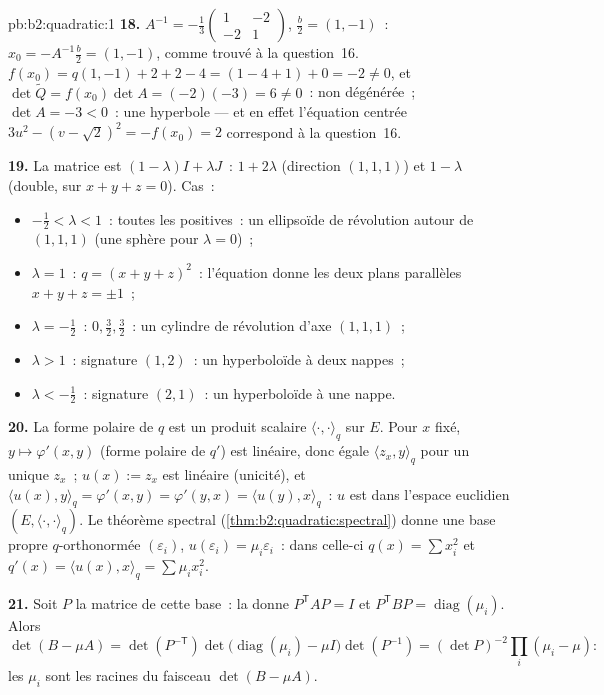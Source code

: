 \begin{solution}{pb:b2:quadratic:1}
\textbf{18.} $A^{-1} = -\frac13\begin{pmatrix} 1 & -2\\ -2 &
1\end{pmatrix}$, $\frac b2 = (1, -1)$~: $x_0 =
-A^{-1}\frac b2 = (1, -1)$, comme trouvé à la question~16. $f(x_0) =
q(1,-1) + 2 + 2 - 4 = (1 - 4 + 1) + 0 = -2 \neq 0$, et
$\det\widetilde Q = f(x_0)\det A = (-2)(-3) = 6 \neq 0$~:
non dégénérée~; $\det A = -3 < 0$~: une hyperbole --- et en effet
l'équation centrée $3u^2 - (v - \sqrt2)^2 = -f(x_0) = 2$
correspond à la question~16.

\textbf{19.} La matrice est $(1-\lambda)I + \lambda J$~:
 $1 + 2\lambda$ (direction $(1,1,1)$) et $1 -
\lambda$ (double, sur $x + y + z = 0$). Cas~:
\begin{itemize}
  \item $-\frac12 < \lambda < 1$~: toutes les 
        positives~: un ellipsoïde de révolution autour de
        $(1,1,1)$ (une sphère pour $\lambda = 0$)~;
  \item $\lambda = 1$~: $q = (x+y+z)^2$~: l'équation donne les
        deux plans parallèles $x + y + z = \pm1$~;
  \item $\lambda = -\frac12$~:  $0, \frac32,
        \frac32$~: un cylindre de révolution d'axe $(1,1,1)$~;
  \item $\lambda > 1$~: signature $(1, 2)$~: un hyperboloïde à
        deux nappes~;
  \item $\lambda < -\frac12$~: signature $(2, 1)$~: un
        hyperboloïde à une nappe.
\end{itemize}

\textbf{20.} La forme polaire de $q$ est un produit scalaire
$\langle\cdot,\cdot\rangle_q$ sur $E$. Pour $x$ fixé, $y \mapsto
\varphi'(x, y)$ (forme polaire de $q'$) est linéaire, donc égale
$\langle z_x, y\rangle_q$ pour un unique $z_x$~; $u(x) := z_x$ est
linéaire (unicité), et $\langle u(x), y\rangle_q =
\varphi'(x,y) = \varphi'(y,x) = \langle u(y), x\rangle_q$~: $u$
est  dans l'espace euclidien $(E,
\langle\cdot,\cdot\rangle_q)$. Le théorème spectral
(\cref{thm:b2:quadratic:spectral}) donne une base propre
$q$-orthonormée $(\varepsilon_i)$, $u(\varepsilon_i) =
\mu_i\varepsilon_i$~: dans celle-ci $q(x) = \sum x_i^2$ et $q'(x) =
\langle u(x), x\rangle_q = \sum\mu_ix_i^2$.

\textbf{21.} Soit $P$ la matrice de cette base~: la 
donne $P^{\mathsf T}AP = I$ et $P^{\mathsf T}BP =
\operatorname{diag}(\mu_i)$. Alors
\[
\det(B - \mu A) = \det(P^{-\mathsf T})
\det\bigl(\operatorname{diag}(\mu_i) - \mu I\bigr)
\det(P^{-1})
= (\det P)^{-2}\prod_i(\mu_i - \mu) :
\]
les $\mu_i$ sont les racines du faisceau $\det(B - \mu A)$.


\end{solution}
